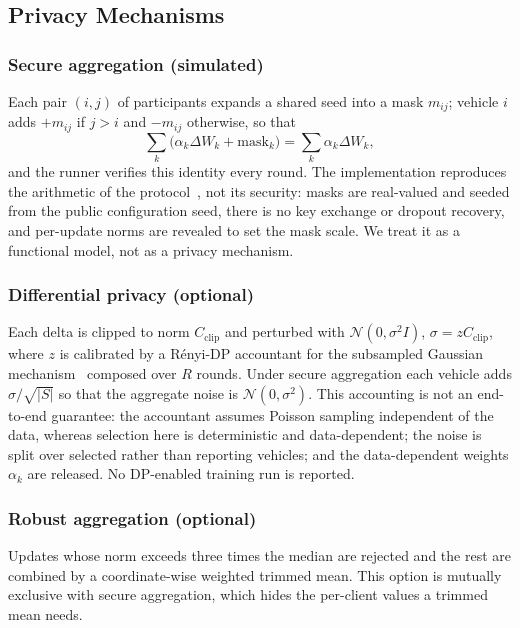\documentclass[journal]{IEEEtran}
\begin{document}
\subsection{Privacy Mechanisms}\label{sec:privacy}
\subsubsection{Secure aggregation (simulated)}
Each pair $(i,j)$ of participants expands a shared seed into a mask $m_{ij}$; vehicle $i$ adds $+m_{ij}$ if $j>i$ and $-m_{ij}$ otherwise, so that
\begin{equation}
\textstyle\sum_{k}\big(\alpha_k\Delta W_k+\mathrm{mask}_k\big)=\sum_{k}\alpha_k\Delta W_k ,
\label{eq:secagg}
\end{equation}
and the runner verifies this identity every round. The implementation reproduces the arithmetic of the protocol~\cite{bonawitz2017secagg}, not its security: masks are real-valued and seeded from the public configuration seed, there is no key exchange or dropout recovery, and per-update norms are revealed to set the mask scale. We treat it as a functional model, not as a privacy mechanism.

\subsubsection{Differential privacy (optional)}
Each delta is clipped to norm $C_{\mathrm{clip}}$ and perturbed with $\mathcal{N}(0,\sigma^2 I)$, $\sigma=zC_{\mathrm{clip}}$, where $z$ is calibrated by a R\'enyi-DP accountant for the subsampled Gaussian mechanism~\cite{mironov2019sgm} composed over $R$ rounds. Under secure aggregation each vehicle adds $\sigma/\sqrt{|S|}$ so that the aggregate noise is $\mathcal{N}(0,\sigma^2)$. This accounting is not an end-to-end guarantee: the accountant assumes Poisson sampling independent of the data, whereas selection here is deterministic and data-dependent; the noise is split over selected rather than reporting vehicles; and the data-dependent weights $\alpha_k$ are released. No DP-enabled training run is reported.

\subsubsection{Robust aggregation (optional)}
Updates whose norm exceeds three times the median are rejected and the rest are combined by a coordinate-wise weighted trimmed mean. This option is mutually exclusive with secure aggregation, which hides the per-client values a trimmed mean needs.
\end{document}
